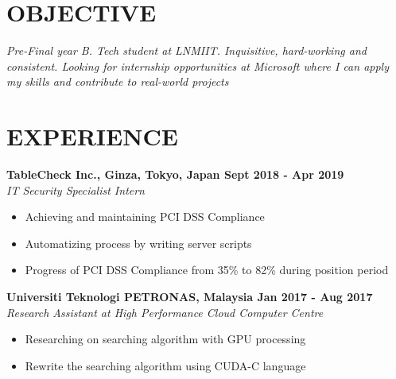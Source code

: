 \documentclass[margin]{res}
\begin{document}
\address{
\\\url{Github : https://www.github.com/louiszhenyean}
\\\url{Hackthebox : https://www.hackthebox.eu/profile/223593}
\\}
\address{
\\louiszhenyean@gmail.com
\\(+60) 19-567 5808
\\ \\}
\begin{resume}
\section{OBJECTIVE}
{\sl Pre-Final year B. Tech student at LNMIIT. Inquisitive, hard-working and consistent. Looking for internship opportunities at Microsoft where I can apply my skills and contribute to real-world projects}
\section{EXPERIENCE}
\textbf{TableCheck Inc., Ginza, Tokyo, Japan 
\hfill{Sept 2018 - Apr 2019}} \\
{\sl IT Security Specialist Intern} \vspace{-0.3cm} \\
    \begin{itemize}
        \item Achieving and maintaining PCI DSS Compliance
        \item Automatizing process by writing server scripts
        \item Progress of PCI DSS Compliance from 35\% to 82\% during position period
    \end{itemize}
\textbf{Universiti Teknologi PETRONAS, Malaysia
\hfill{Jan 2017 - Aug 2017}} \\
{\sl Research Assistant at High Performance Cloud Computer Centre} \vspace{-0.3cm} \\
    \begin{itemize}
        \item Researching on searching algorithm with GPU processing
        \item Rewrite the searching algorithm using CUDA-C language
    \end{itemize}

\end{resume}
\end{document}
